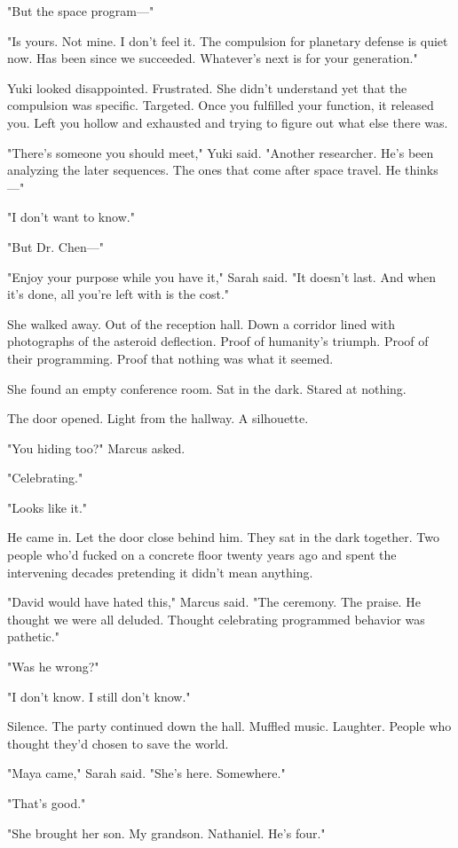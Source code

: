 "But the space program—"

"Is yours. Not mine. I don't feel it. The compulsion for planetary defense is quiet now. Has been since we succeeded. Whatever's next is for your generation."

Yuki looked disappointed. Frustrated. She didn't understand yet that the compulsion was specific. Targeted. Once you fulfilled your function, it released you. Left you hollow and exhausted and trying to figure out what else there was.

"There's someone you should meet," Yuki said. "Another researcher. He's been analyzing the later sequences. The ones that come after space travel. He thinks—"

"I don't want to know."

"But Dr. Chen—"

"Enjoy your purpose while you have it," Sarah said. "It doesn't last. And when it's done, all you're left with is the cost."

She walked away. Out of the reception hall. Down a corridor lined with photographs of the asteroid deflection. Proof of humanity's triumph. Proof of their programming. Proof that nothing was what it seemed.

She found an empty conference room. Sat in the dark. Stared at nothing.

The door opened. Light from the hallway. A silhouette.

"You hiding too?" Marcus asked.

"Celebrating."

"Looks like it."

He came in. Let the door close behind him. They sat in the dark together. Two people who'd fucked on a concrete floor twenty years ago and spent the intervening decades pretending it didn't mean anything.

"David would have hated this," Marcus said. "The ceremony. The praise. He thought we were all deluded. Thought celebrating programmed behavior was pathetic."

"Was he wrong?"

"I don't know. I still don't know."

Silence. The party continued down the hall. Muffled music. Laughter. People who thought they'd chosen to save the world.

"Maya came," Sarah said. "She's here. Somewhere."

"That's good."

"She brought her son. My grandson. Nathaniel. He's four."

